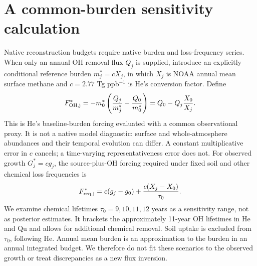 \documentclass{article}
\begin{document}
\section*{A common-burden sensitivity calculation}
Native reconstruction budgets require native burden and loss-frequency series.
When only an annual OH removal flux $Q_j$ is supplied, introduce an explicitly
conditional reference burden $m^*_j=cX_j$, in which $X_j$ is NOAA annual mean
surface methane and $c=2.77$ Tg ppb$^{-1}$ is He's conversion factor. Define
\begin{equation}
F^*_{\rm OH,j}=-m^*_0\left(\frac{Q_j}{m^*_j}-\frac{Q_0}{m^*_0}\right)
=Q_0-Q_j\frac{X_0}{X_j}.
\end{equation}
This is He's baseline-burden forcing evaluated with a common observational
proxy. It is not a native model diagnostic: surface and whole-atmosphere
abundances and their temporal evolution can differ. A constant multiplicative
error in $c$ cancels; a time-varying representativeness error does not.
For observed growth $G^*_j=c g_j$, the source-plus-OH forcing required under
fixed soil and other chemical loss frequencies is
\begin{equation}
F^*_{\rm req,j}=c(g_j-g_0)+\frac{c(X_j-X_0)}{\tau_0}.
\end{equation}
We examine chemical lifetimes $\tau_0=9,10,11,12$ years as a sensitivity range,
not as posterior estimates. It brackets the approximately 11-year OH lifetimes
in He and Qu and allows for additional chemical removal. Soil uptake is excluded
from $\tau_0$, following He. Annual mean burden is an approximation to the
burden in an annual integrated budget. We therefore do not fit these scenarios
to the observed growth or treat discrepancies as a new flux inversion.
\end{document}

